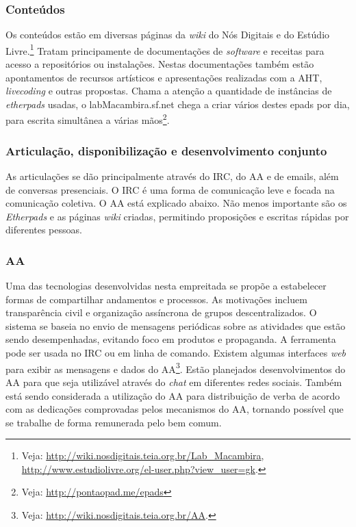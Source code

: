       \subsubsection{Conteúdos}

      Os conteúdos estão em diversas páginas da \emph{wiki} do Nós Digitais e do Estúdio Livre.\footnote{Veja: \url{http://wiki.nosdigitais.teia.org.br/Lab_Macambira}, \url{http://www.estudiolivre.org/el-user.php?view_user=gk}.} Tratam principamente de documentações de \emph{software} e receitas para acesso a repositórios ou instalações. Nestas documentações também estão apontamentos de recursos artísticos e apresentações realizadas com a AHT, \emph{livecoding} e outras propostas. Chama a atenção a quantidade de instâncias de \emph{etherpads} usadas, o labMacambira.sf.net chega a criar vários destes epads por dia, para escrita simultânea a várias mãos\footnote{Veja: \url{http://pontaopad.me/epads}}.

      \subsubsection{Articulação, disponibilização e desenvolvimento conjunto}

As articulações se dão principalmente através do IRC, do AA e de emails, além de conversas presenciais. O IRC é uma forma de comunicação leve e focada na comunicação coletiva. O AA está explicado abaixo. Não menos importante são os \emph{Etherpads} e as páginas \emph{wiki} criadas, permitindo proposições e escritas rápidas por diferentes pessoas.


\subsubsection{AA}

Uma das tecnologias desenvolvidas nesta empreitada se propõe a estabelecer formas de compartilhar andamentos e processos. As motivações incluem transparência civil e organização assíncrona de grupos descentralizados. O sistema se baseia no envio de mensagens periódicas sobre as atividades que estão sendo desempenhadas, evitando foco em produtos e propaganda. A ferramenta pode ser usada no IRC ou em linha de comando. Existem algumas interfaces \emph{web} para exibir as mensagens e dados do AA\footnote{Veja: \url{http://wiki.nosdigitais.teia.org.br/AA}.}. Estão planejados desenvolvimentos do AA para que seja utilizável através do \emph{chat} em diferentes redes sociais. Também está sendo considerada a utilização do AA para distribuição de verba de acordo com as dedicações comprovadas pelos mecanismos do AA, tornando possível que se trabalhe de forma remunerada pelo bem comum.


